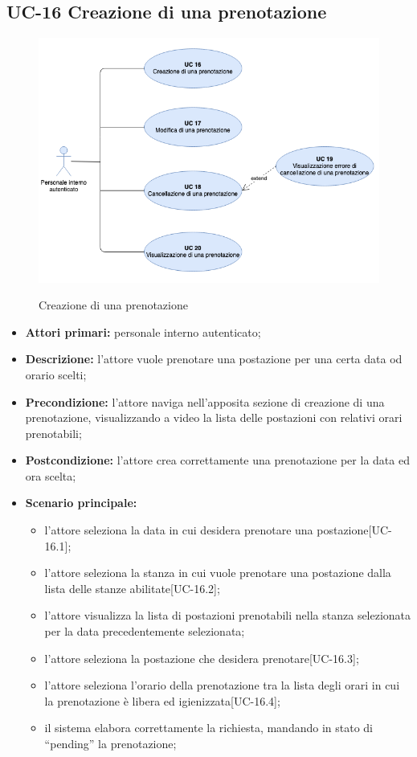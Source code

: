 \subsection{UC-16 Creazione di una prenotazione}
\begin{figure}[H]
	\centering
	  \includegraphics[width=\textwidth]{src/CasiDUso/immagini/UC-gestionePrenotazione.png}\\
	\caption{Creazione di una prenotazione}
  \end{figure}
\begin{itemize}
\item \textbf{Attori primari:} personale interno autenticato;
\item \textbf{Descrizione:} l'attore vuole prenotare una postazione per una certa data od orario scelti;
\item \textbf{Precondizione:} l'attore naviga nell’apposita sezione di creazione di una prenotazione, visualizzando a video la lista delle postazioni con relativi orari prenotabili;
\item \textbf{Postcondizione:} l'attore crea correttamente una prenotazione per la data ed ora scelta;
\item \textbf{Scenario principale:} 
	\begin{itemize}
		\item l'attore seleziona la data in cui desidera prenotare una postazione[UC-16.1];
		\item l'attore seleziona la stanza in cui vuole prenotare una postazione dalla lista delle stanze abilitate[UC-16.2];
		\item l'attore visualizza la lista di postazioni prenotabili nella stanza selezionata per la data precedentemente selezionata;
		\item l'attore seleziona la postazione che desidera prenotare[UC-16.3];
		\item l'attore seleziona l'orario della prenotazione tra la lista degli orari in cui la prenotazione è libera ed igienizzata[UC-16.4];
		\item il sistema elabora correttamente la richiesta, mandando in stato di “pending” la prenotazione;
	\end{itemize}
\end{itemize}

